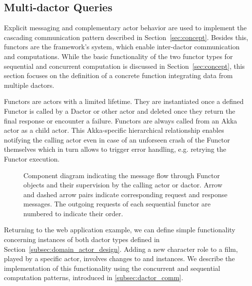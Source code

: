 \subsection[Multi-Dactor Queries]{Multi-\Gls{dactor} Queries}\label{subsec:multi_dactor_queries}

Explicit messaging and complementary actor behavior are used to implement the cascading communication pattern described in Section~\ref{sec:concept}.
Besides this, \glspl{functor} are the framework's system, which enable inter-\gls{dactor} communication and computations.
While the basic functionality of the two \gls{functor} types for sequential and concurrent computation is discussed in Section~\ref{sec:concept}, this section focuses on the definition of a concrete function integrating data from multiple \glspl{dactor}.

Functors are actors with a limited lifetime.
They are instantiated once a defined Functor is called by a Dactor or other actor and deleted once they return the final response or encounter a failure.
Functors are always called from an Akka actor as a child actor.
This Akka-specific hierarchical relationship enables notifying the calling actor even in case of an unforseen crash of the Functor themselves which in turn allows to trigger error handling, e.g. retrying the Functor execution.

\begin{figure}[t]
  \centering
  
  \caption{Component diagram indicating the message flow through Functor objects and their supervision by the calling actor or \gls{dactor}. Arrow and dashed arrow pairs indicate corresponding request and response messages. The outgoing requests of each sequential functor are numbered to indicate their order.}
  \label{fig:functor_diagram}
\end{figure}

Returning to the web application example, we can define simple functionality concerning instances of both \gls{dactor} types defined in Section~\ref{subsec:domain_actor_design}.
Adding a new character role to a film, played by a specific actor, involves changes to  and  instances.
We describe the implementation of this functionality using the concurrent and sequential computation patterns, introduced in \cref{subsec:dactor_comm}.

